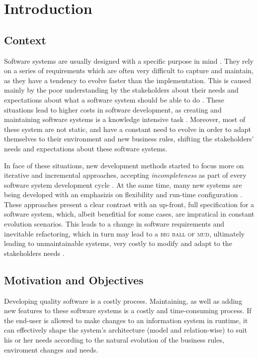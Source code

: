 \chapter{Introduction}\label{chap:intro}

\section{Context}\label{sec:context}

Software systems are usually designed with a specific purpose in mind \cite{}. They rely on a series of requirements which are often very difficult to capture and maintain, as they have a tendency to evolve faster than the implementation. This is caused mainly by the poor understanding by the stakeholders about their needs and expectations about what a software system should be able to do \cite{PT07}. These situations lead to higher costs in software development, as creating and maintaining software systems is a knowledge intensive task \cite{AdOdSBD07}. Moreover, most of these system are not static, and have a constant need to evolve in order to adapt themselves to their environment and new business rules, shifting the stakeholders' needs and expectations about these software systems.

In face of these situations, new development methods started to focus more on iterative and incremental approaches, accepting \textit{incompleteness} as part of every software system development cycle \cite{WC03}. At the same time, many new systems are being developed with an emphasizis on flexibility and run-time configuration \cite{YJ02}. These approaches present a clear contrast with an up-front, full specification for a software system, which, albeit benefitial for some cases, are impratical in constant evolution scenarios. This leads to a change in software requirements and inevitable refactoring, which in turn may lead to a \textsc{big ball of mud}, ultimately leading to unmaintainable systems, very costly to modify and adapt to the stakeholders needs \cite{FY97}.

\section{Motivation and Objectives}\label{sec:goals}

Developing quality software is a costly process. Maintaining, as well as adding new features to these software systems is a costly and time-consuming process. If the end-user is allowed to make changes to an information system in runtime, it can effectively shape the system's architecture (model and relation-wise) to suit his or her needs according to the natural evolution of the business rules, enviroment changes and needs.

